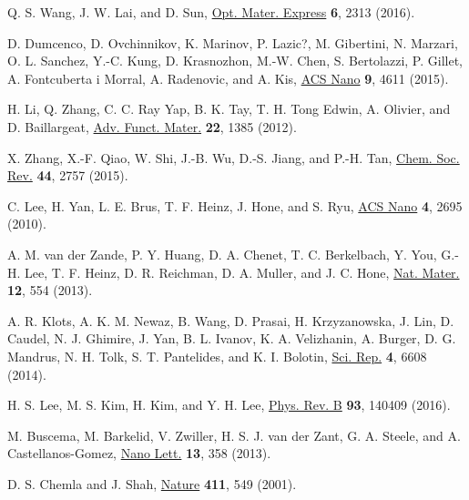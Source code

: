 \documentclass[%
 reprint,%
 amssymb, amsmath,%
 aip,cha,%
]{revtex4-1}
\begin{document}
\begin{thebibliography}{9}
Q. S. Wang, J. W. Lai, and D. Sun,
\href{https://www.osapublishing.org/ome/abstract.cfm?uri=ome-6-7-2313}{Opt. Mater. Express} \textbf{6}, 2313 (2016).

D. Dumcenco, D. Ovchinnikov, K. Marinov, P. Lazic?, M. Gibertini, N. Marzari, O. L. Sanchez, Y.-C. Kung, D. Krasnozhon, M.-W. Chen, S. Bertolazzi, P. Gillet, A. Fontcuberta i Morral, A. Radenovic, and A. Kis,
\href{http://pubs.acs.org/doi/abs/10.1021/acsnano.5b01281}{ACS Nano} \textbf{9}, 4611 (2015).

H. Li, Q. Zhang, C. C. Ray Yap, B. K. Tay, T. H. Tong Edwin, A. Olivier, and D. Baillargeat,
\href{http://onlinelibrary.wiley.com/doi/10.1002/adfm.201102111/abstract}{Adv. Funct. Mater.} \textbf{22}, 1385 (2012).

X. Zhang, X.-F. Qiao, W. Shi, J.-B. Wu, D.-S. Jiang, and P.-H. Tan,
\href{http://pubs.rsc.org/en/Content/ArticleLanding/2015/CS/C4CS00282B#!divAbstract}{Chem. Soc. Rev.} \textbf{44}, 2757 (2015).

C. Lee, H. Yan, L. E. Brus, T. F. Heinz, J. Hone, and S. Ryu, 
\href{http://pubs.acs.org/doi/abs/10.1021/nn1003937}{ACS Nano} \textbf{4}, 2695 (2010).

A. M. van der Zande, P. Y. Huang, D. A. Chenet, T. C. Berkelbach, Y. You, G.-H. Lee, T. F. Heinz, D. R. Reichman, D. A. Muller, and J. C. Hone,
\href{https://www.nature.com/nmat/journal/v12/n6/full/nmat3633.html}{Nat. Mater.} \textbf{12}, 554 (2013).

A. R. Klots, A. K. M. Newaz, B. Wang, D. Prasai, H. Krzyzanowska, J. Lin, D. Caudel, N. J. Ghimire, J. Yan, B. L. Ivanov, K. A. Velizhanin, A. Burger, D. G. Mandrus, N. H. Tolk, S. T. Pantelides, and K. I. Bolotin,
\href{https://www.nature.com/articles/srep06608}{Sci. Rep.} \textbf{4}, 6608 (2014).

H. S. Lee, M. S. Kim, H. Kim, and Y. H. Lee,
\href{https://journals.aps.org/prb/abstract/10.1103/PhysRevB.93.140409}{Phys. Rev. B} \textbf{93}, 140409 (2016).

M. Buscema, M. Barkelid, V. Zwiller, H. S. J. van der Zant, G. A. Steele, and A. Castellanos-Gomez,
\href{http://pubs.acs.org/doi/abs/10.1021/nl303321g}{Nano Lett.} \textbf{13}, 358 (2013).

D. S. Chemla and J. Shah,
\href{https://www.nature.com/nature/journal/v411/n6837/full/411549a0.html}{Nature} \textbf{411}, 549 (2001).


\end{thebibliography}
\end{document}
